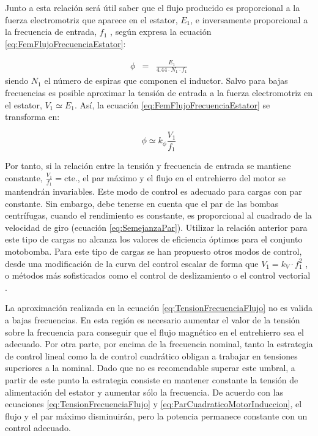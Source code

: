 Junto a esta relación será útil saber que el flujo producido es proporcional
a la fuerza electromotriz que aparece en el estator, $E_{1}$, e inversamente
proporcional a la frecuencia de entrada, $f_{1}$ , según expresa
la ecuación \ref{eq:FemFlujoFrecuenciaEstator}:

\begin{eqnarray}
\phi & = & \frac{E_{1}}{4.44\cdot N_{1}\cdot f_{1}}\label{eq:FemFlujoFrecuenciaEstator}\end{eqnarray}
siendo $N_{1}$ el número de espiras que componen el inductor. Salvo
para bajas frecuencias es posible aproximar la tensión de entrada
a la fuerza electromotriz en el estator, $V_{1}\simeq E_{1}$. Así,
la ecuación \ref{eq:FemFlujoFrecuenciaEstator} se transforma en:

\begin{equation}
\phi\simeq k_{\phi}\frac{V_{1}}{f_{1}}\label{eq:TensionFrecuenciaFlujo}\end{equation}


Por tanto, si la relación entre la tensión y frecuencia de entrada
se mantiene constante, $\frac{V_{1}}{f_{1}}=\mathrm{cte.}$, el
par máximo y el flujo en el entrehierro del motor se mantendrán invariables.
Este modo de control es adecuado para cargas con par constante. Sin
embargo, debe tenerse en cuenta que el par de las bombas centrífugas,
cuando el rendimiento es constante, es proporcional al cuadrado de
la velocidad de giro (ecuación \ref{eq:SemejanzaPar}). Utilizar la
relación anterior para este tipo de cargas no alcanza los valores
de eficiencia óptimos para el conjunto motobomba. Para este tipo de
cargas se han propuesto otros modos de control, desde una modificación
de la curva del control escalar de forma que $V_{1}=k_{V}\cdot f_{1}^{2}$
\citep{Abella.Lorenzo.ea2003,Narvarte.Lorenzo2006}, o métodos más
sofisticados como el control de deslizamiento o el control vectorial
\citep{Bose2002,Bhat.Pittet.ea1987,Correa.Nevesy.ea2008,Famouri.Cathey1991}.

La aproximación realizada en la ecuación \ref{eq:TensionFrecuenciaFlujo}
no es valida a bajas frecuencias. En esta región es necesario aumentar
el valor de la tensión sobre la frecuencia para conseguir que el flujo
magnético en el entrehierro sea el adecuado. Por otra parte, por encima
de la frecuencia nominal, tanto la estrategia de control lineal como
la de control cuadrático obligan a trabajar en tensiones superiores
a la nominal. Dado que no es recomendable superar este umbral, a partir
de este punto la estrategia consiste en mantener constante la tensión
de alimentación del estator y aumentar sólo la frecuencia. De acuerdo
con las ecuaciones \ref{eq:TensionFrecuenciaFlujo} y \ref{eq:ParCuadraticoMotorInduccion},
el flujo y el par máximo disminuirán, pero la potencia permanece constante
con un control adecuado.


